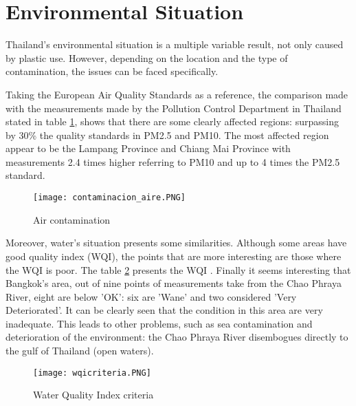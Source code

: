 \documentclass[twoside,a4paper,12pt]{report}
\begin{document}



\section{Environmental Situation}
Thailand's environmental situation is a multiple variable result, not only caused by plastic use. However, depending on the location and the type of contamination, the issues can be faced specifically. 

Taking the European Air Quality Standards as a reference, the comparison made with the measurements made by the Pollution Control Department in Thailand stated in table \ref{Aircont_thai}, shows that there are some clearly affected regions: surpassing by 30\% the quality standards in PM2.5 and PM10. The most affected region appear to be the Lampang Province and Chiang Mai Province with measurements 2.4 times higher referring to PM10 and up to 4 times the PM2.5 standard.

\begin{figure}[H]
    \centering
    \texttt{[image: contaminacion\_aire.PNG]}
    \caption{Air contamination \cite{PCD_air}\cite {Air_qua_stdd}}
     \label{Aircont_thai} 
\end{figure}

Moreover, water's situation presents some similarities. Although some areas have good quality index (WQI), the points that are more interesting are those where the WQI is poor. The table \ref{WQI_thai} presents the WQI \cite{Wa_qua_thai}. Finally it seems interesting that Bangkok's area, out of nine points of measurements take from the Chao Phraya River, eight are below 'OK': six are 'Wane' and two considered 'Very Deteriorated'. It can be clearly seen that the condition in this area are very inadequate. This leads to other problems, such as sea contamination and deterioration of the environment: the Chao Phraya River disembogues directly to the gulf of Thailand (open waters).  


\begin{figure}
    \centering
    \texttt{[image: wqicriteria.PNG]}
    \caption{Water Quality Index criteria \cite{Wa_qua_thai}}
     \label{WQI_thai} 
\end{figure}
\end{document}
